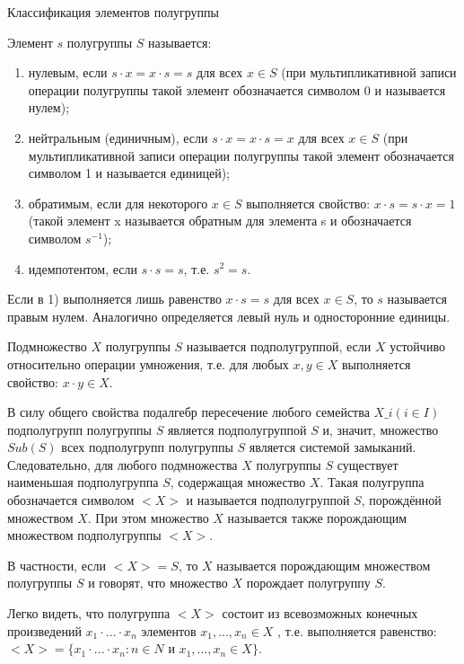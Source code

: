 \documentclass[bachelor, och, labwork]{shiza}
\begin{document}
	Классификация элементов полугруппы
	
	Элемент $s$ полугруппы $S$ называется:
	
	\begin{enumerate}
		
	\item нулевым, если $s\cdot x=x\cdot s=s$ для всех $x\in S $ (при мультипликативной записи операции полугруппы такой элемент обозначается символом 0 и называется нулем);
	\item нейтральным (единичным), если $s\cdot x=x\cdot s=x$ для всех $x\in S $ (при мультипликативной записи операции полугруппы такой элемент обозначается символом 1 и называется единицей);
	\item обратимым, если для некоторого $x \in S $ выполняется свойство: $x\cdot s=s\cdot x=1$ (такой элемент x называется обратным для элемента s и обозначается символом $s^{-1}$);
	\item идемпотентом, если $s\cdot s=s$, т.е. $s^2=s$.
	
	\end{enumerate} 
	
	Если в 1) выполняется лишь равенство $x\cdot s=s$ для всех $x \in S$, то $s$ называется правым нулем. Аналогично определяется левый нуль и односторонние единицы.
	
	Подмножество $X$ полугруппы $S$ называется подполугруппой, если $X$ устойчиво относительно операции умножения, т.е. для любых $x,y \in X$ выполняется свойство: $x \cdot y \in X$.
	
	В силу общего свойства подалгебр пересечение любого семейства $X\_i (i \in I) $ подполугрупп полугруппы $S$ является подполугруппой $S$ и, значит, множество $Sub(S)$ всех подполугрупп полугруппы $S$ является системой замыканий. Следовательно, для любого подмножества $X$ полугруппы $S$ существует наименьшая подполугруппа $S$, содержащая множество $X$. Такая полугруппа обозначается символом $<X>$ и называется подполугруппой $S$, порождённой множеством $X$. При этом множество $X$ называется также порождающим множеством подполугруппы $<X>$. 
	
	В частности, если $<X> = S$, то $X$ называется порождающим множеством полугруппы $S$ и говорят, что множество $X$ порождает полугруппу $S$. 
	
	Легко видеть, что полугруппа $<X>$ состоит из всевозможных конечных произведений $x_1 \cdot ... \cdot x_n$ элементов $x_1,..., x_n \in X$ , т.е. выполняется равенство: $<X> = \{x_1 \cdot ... \cdot x_n:  n \in N $ и $x_1,..., x_n  \in X\}.$
\end{document}
